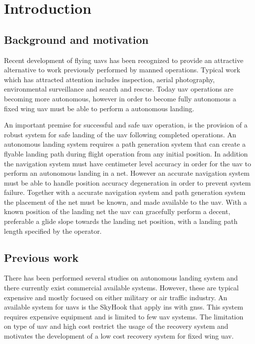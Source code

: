 \chapter{Introduction}
\section{Background and motivation}
Recent development of flying \acrfull{uav}s has been recognized to provide an attractive alternative to work previously performed by manned operations. Typical work which has attracted attention includes inspection, aerial photography, environmental surveillance and search and rescue. Today \gls{uav} operations are becoming more autonomous, however in order to become fully autonomous a fixed wing \gls{uav} must be able to perform a autonomous landing.

An important premise for successful and safe \gls{uav} operation, is the provision of a robust system for safe landing of the \gls{uav} following completed operations. An autonomous landing system requires a path generation system that can create a flyable landing path during flight operation from any initial position. In addition the navigation system must have centimeter level accuracy in order for the \gls{uav} to perform an autonomous landing in a net. However an accurate navigation system must be able to handle position accuracy degeneration in order to prevent system failure. Together with a accurate navigation system and path generation system the placement of the net must be known, and made available to the \gls{uav}. With a known position of the landing net the \gls{uav} can gracefully perform a decent, preferable a glide slope towards the landing net position, with a landing path length specified by the operator.
\section{Previous work}
There has been performed several studies on autonomous landing system and there currently exist commercial available systems. However, these are typical expensive and mostly focused on either military or air traffic industry. An available system for \glspl{uav} is the SkyHook that apply \gls{ins} with \acrfull{gnss}\citep{SkyHook}. This system requires expensive equipment and is limited to few \gls{uav} systems. The limitation on type of \gls{uav} and high cost restrict the usage of the recovery system and motivates the development of a low cost recovery system for fixed wing \gls{uav}.

